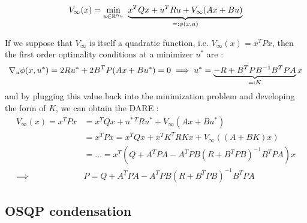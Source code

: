 \documentclass[12pt]{article}
\begin{document}
$$V_\infty(x)=\min_{u\in\mathbb{R}^{n_u}}~\underbrace{x^TQx+u^TRu+V_\infty(Ax+Bu)}_{=:\phi(x,u)}$$

If we suppose that $V_\infty$ is itself a quadratic function, i.e. $V_\infty(x)=x^TPx$, then the first order optimality conditions at a minimizer $u^*$ are :
$$\nabla_u\phi(x,u^*)=2Ru^*+2B^TP(Ax+Bu^*)=0\implies u^*=\underbrace{-R+B^TPB^{-1}B^TPA}_{=:K}x$$
and by plugging this value back into the minimization problem and developing the form of $K$, we can obtain the DARE :
\begin{align*}
	V_\infty(x)=x^TPx&=x^TQx+u^{*~T}Ru^*+V_\infty(Ax+Bu^*)\\
	&=x^TPx=x^TQx +x^TK^TRKx+V_\infty((A+BK)x)\\
	&=\dots=x^T(Q+A^TPA-A^TPB(R+B^TPB)^{-1}B^TPA)x\\
	\implies&\boxed{P=Q+A^TPA-A^TPB(R+B^TPB)^{-1}B^TPA}
\end{align*}


\subsection*{OSQP condensation}\label{sec:osqp-condensation}
\end{document}
